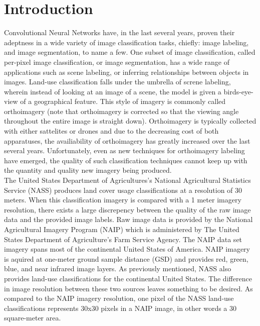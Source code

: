 \documentclass[12pt]{article}
\begin{document}
\newpage

\section{Introduction}

Convolutional Neural Networks have, in the last several years, proven their adeptness in a wide variety of image classification tasks, chiefly: image labeling, and image segmentation, to name a few. One subset of image classification, called per-pixel image classification, or image segmentation, has a wide range of applications such as scene labeling, or inferring relationships between objects in images. Land-use classification falls under the umbrella of screne labeling, wherein instead of looking at an image of a scene, the model is given a birds-eye-view of a geographical feature. This style of imagery is commonly called orthoimagery (note that orthoimagery is corrected so that the viewing angle throughout the entire image is straight down). Orthoimagery is typically collected with either sattelites or drones and due to the decreasing cost of both apparatuses, the availiability of orthoimagery has greatly increased over the last several years. Unfortunately, even as new techniques for orthoimagery labeling have emerged, the quality of such classification techniques cannot keep up with the quantity and quality new imagery being produced. 
\\

The United States Department of Agricultures's National Agricultural Statistics Service (NASS) produces land cover usage classifications at a resolution of 30 meters. When this classification imagery is compared with a 1 meter imagery resolution, there exists a large discrepency between the quality of the raw image data and the provided image labels. Raw image data is provided by the National Agricultural Imagery Program (NAIP) which is administered by The United States Department of Agriculture's Farm Service Agency. The NAIP data set imagery spans most of the continental United States of America. NAIP imagery is aquired at one-meter ground sample distance (GSD) and provides red, green, blue, and near infrared image layers. As previously mentioned, NASS also provides land-use classifications for the continental United States. The difference in image resolution between these two sources leaves something to be desired. As compared to the NAIP imagery resolution, one pixel of the NASS land-use classifications represents 30x30 pixels in a NAIP image, in other words a 30 square-meter area. 
\\
\end{document}
